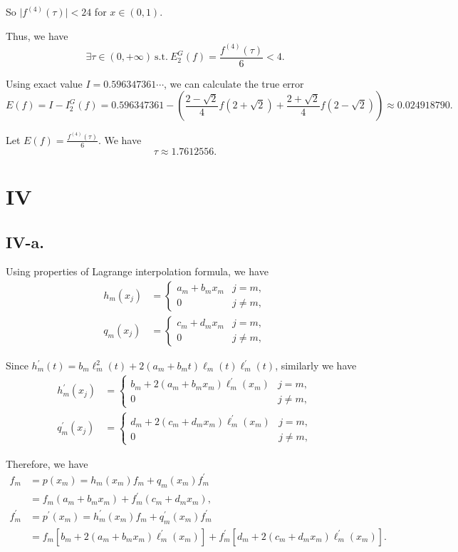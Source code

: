 \documentclass[a4paper]{article}
\begin{document}
So $\lvert f^{(4)}(\tau)\rvert < 24$ for $x\in(0,1).$

Thus, we have
$$
\exists \tau \in(0,+\infty)\ \text{s.t.}\ E^G_2(f)=\frac{f^{(4)}(\tau)}{6} < 4.
$$

Using exact value $I=0.596347361\cdots$, we can calculate the true error
$$
E(f)=I-I^G_2(f)=0.596347361-(\frac{2-\sqrt{2}}{4}f(2+\sqrt{2})+\frac{2+\sqrt{2}}{4}f(2-\sqrt{2}))\approx0.024918790.
$$

Let $E(f)=\frac{f^{(4)}(\tau)}{6}$. We have
$$
\tau\approx1.7612556.
$$

\section*{IV}
\subsection*{IV-a.}
Using properties of Lagrange interpolation formula, we have
$$
\begin{aligned}
  h_m(x_j)&=\begin{cases}
    a_m+b_m x_m &  j=m,\\
    0 & j\neq m,
  \end{cases}\\
  q_m(x_j)&=\begin{cases}
    c_m+d_m x_m &  j=m,\\
    0 &  j\neq m,
  \end{cases}
\end{aligned}
$$

Since $h_m^{\prime}(t)=b_m \ell_m^2(t)+2(a_m +b_mt)\ell_m(t)\ell_m^{\prime}(t)$, similarly we have
$$
\begin{aligned}
  h_m^{\prime}(x_j)&=\begin{cases}
    b_m + 2(a_m+b_m x_m)\ell_m^{\prime}(x_m) &  j=m,\\
    0 &  j\neq m,
  \end{cases}\\
  q_m^{\prime}(x_j)&=\begin{cases}
    d_m + 2(c_m+d_m x_m)\ell_m^{\prime}(x_m) &  j=m,\\
    0 &  j\neq m,
  \end{cases}
\end{aligned}
$$

Therefore, we have
$$
\begin{aligned}
  f_m&=p(x_m)=h_m(x_m)f_m+q_m(x_m)f^{\prime}_m\\
  &=f_m(a_m+b_m x_m)+f^{\prime}_m(c_m+d_m x_m),\\
  f_m^{\prime}&=p^{\prime}(x_m)=h_m^{\prime}(x_m)f_m+q_m^{\prime}(x_m)f^{\prime}_m\\
  &=f_m[b_m + 2(a_m+b_m x_m)\ell_m^{\prime}(x_m)]+f^{\prime}_m[d_m + 2(c_m+d_m x_m)\ell_m^{\prime}(x_m)].
\end{aligned}
$$
\end{document}
